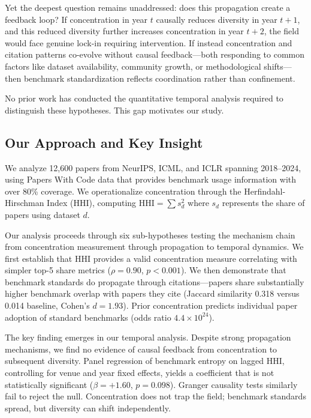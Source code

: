 Yet the deepest question remains unaddressed: does this propagation create a feedback loop? If concentration in year $t$ causally reduces diversity in year $t+1$, and this reduced diversity further increases concentration in year $t+2$, the field would face genuine lock-in requiring intervention. If instead concentration and citation patterns co-evolve without causal feedback---both responding to common factors like dataset availability, community growth, or methodological shifts---then benchmark standardization reflects coordination rather than confinement.

No prior work has conducted the quantitative temporal analysis required to distinguish these hypotheses. This gap motivates our study.

\subsection{Our Approach and Key Insight}

We analyze 12,600 papers from NeurIPS, ICML, and ICLR spanning 2018--2024, using Papers With Code data that provides benchmark usage information with over 80\% coverage. We operationalize concentration through the Herfindahl-Hirschman Index (HHI), computing $\text{HHI} = \sum s_d^2$ where $s_d$ represents the share of papers using dataset $d$.

Our analysis proceeds through six sub-hypotheses testing the mechanism chain from concentration measurement through propagation to temporal dynamics. We first establish that HHI provides a valid concentration measure correlating with simpler top-5 share metrics ($\rho = 0.90$, $p < 0.001$). We then demonstrate that benchmark standards do propagate through citations---papers share substantially higher benchmark overlap with papers they cite (Jaccard similarity 0.318 versus 0.014 baseline, Cohen's $d = 1.93$). Prior concentration predicts individual paper adoption of standard benchmarks (odds ratio $4.4 \times 10^{24}$).

The key finding emerges in our temporal analysis. Despite strong propagation mechanisms, we find no evidence of causal feedback from concentration to subsequent diversity. Panel regression of benchmark entropy on lagged HHI, controlling for venue and year fixed effects, yields a coefficient that is not statistically significant ($\beta = +1.60$, $p = 0.098$). Granger causality tests similarly fail to reject the null. Concentration does not trap the field; benchmark standards spread, but diversity can shift independently.

